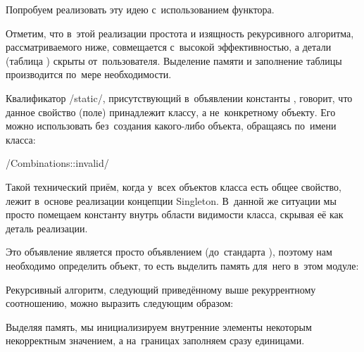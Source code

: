 Попробуем реализовать эту идею с~использованием функтора.


Отметим, что в~этой реализации простота и изящность рекурсивного алгоритма, рассматриваемого ниже, совмещается с~высокой эффективностью, а детали (таблица ) скрыты от~пользователя. Выделение памяти и заполнение таблицы производится по~мере необходимости.

Квалификатор \cppinline/static/, присутствующий в~объявлении константы , говорит, что данное свойство (поле) принадлежит классу, а не~конкретному объекту. Его можно использовать без~создания какого-либо объекта, обращаясь по~имени класса:

\cpp/Combinations::invalid/

Такой технический приём, когда у~всех объектов класса есть общее свойство, лежит в~основе реализации концепции \textenglish{Singleton}. В~данной же ситуации мы просто помещаем константу внутрь области видимости класса, скрывая её как деталь реализации.

Это объявление является просто объявлением (до~стандарта ), поэтому нам необходимо определить объект, то есть выделить память для~него в~этом модуле:


Рекурсивный алгоритм, следующий приведённому выше рекуррентному соотношению, можно выразить следующим образом:


\noindent Выделяя память, мы инициализируем внутренние элементы некоторым некорректным значением, а на~границах заполняем сразу единицами.

